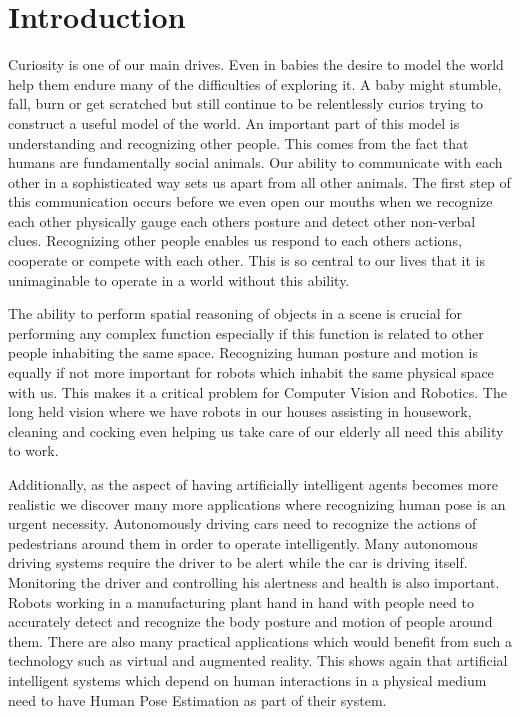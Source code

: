
\chapter{Introduction}\label{chapter:introduction}

Curiosity is one of our main drives. Even in babies the desire to model the world help them endure  many of the difficulties of exploring it. A baby might stumble, fall, burn or get scratched but still  continue to be relentlessly curios trying to construct a useful model of the world. An important part of this model is understanding and recognizing other people. This comes from the fact that humans are fundamentally social animals. Our ability to communicate with each other in a sophisticated way sets us apart from all other animals. The first step of this communication occurs before we even open our mouths when we recognize each other physically gauge each others posture and detect other non-verbal clues. Recognizing other people enables us respond to each others actions, cooperate or compete with each other. This is so central to our lives that it is unimaginable to operate in a world without this ability. 

The ability to perform spatial reasoning of objects in a scene is crucial for performing any complex function especially if this function is related to other people inhabiting the same space. Recognizing human posture and motion is equally if not more important for robots which inhabit the same physical space with us. This makes it a critical problem for Computer Vision and Robotics. The long held vision where we have robots in our houses assisting in housework, cleaning and cocking even helping us take care of our elderly all need this ability to work.

Additionally, as the aspect of having artificially intelligent agents becomes more realistic we discover many more applications where recognizing human pose is an urgent necessity. Autonomously driving cars need to recognize the actions of pedestrians around them in order to operate intelligently. Many autonomous driving systems require the driver to be alert while the car is driving itself. Monitoring the driver and controlling his alertness and health is also important. Robots working in a manufacturing plant hand in hand with people need to accurately detect and recognize the body posture and motion of people around them. There are also many practical applications which would benefit from such a technology such as virtual and augmented reality. This shows again that artificial intelligent systems which depend on human interactions in a physical medium need to have Human Pose Estimation as part of their system.

